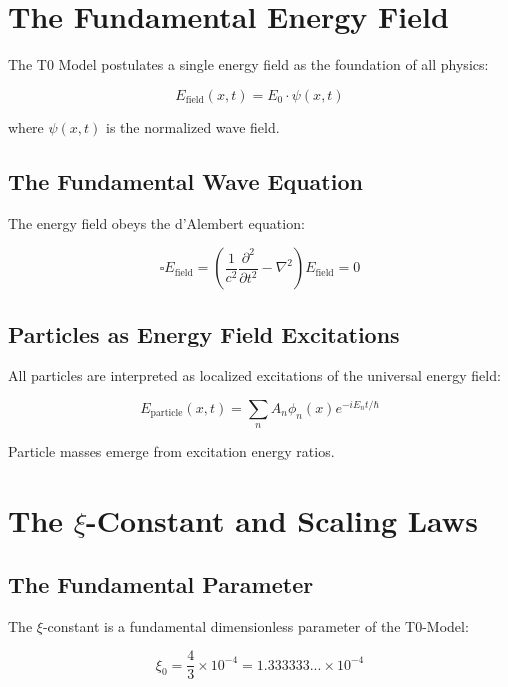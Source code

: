	\section{The Fundamental Energy Field}
	
	The T0 Model postulates a single energy field as the foundation of all physics:
	
	\begin{equation}
		E_{\text{field}}(x,t) = E_0 \cdot \psi(x,t)
	\end{equation}
	
	where $\psi(x,t)$ is the normalized wave field.
	
	\subsection{The Fundamental Wave Equation}
	
	The energy field obeys the d'Alembert equation:
	
	\begin{equation}
		\square E_{\text{field}} = \left(\frac{1}{c^2}\frac{\partial^2}{\partial t^2} - \nabla^2\right) E_{\text{field}} = 0
	\end{equation}
	
	\subsection{Particles as Energy Field Excitations}
	
	All particles are interpreted as localized excitations of the universal energy field:
	
	\begin{equation}
		E_{\text{particle}}(x,t) = \sum_n A_n \phi_n(x) e^{-iE_n t/\hbar}
	\end{equation}
	
	Particle masses emerge from excitation energy ratios.
	
\section{The $\xi$-Constant and Scaling Laws}

\subsection{The Fundamental Parameter}

The $\xi$-constant is a fundamental dimensionless parameter of the T0-Model:

\begin{equation}
	\boxed{\xi_0 = \frac{4}{3} \times 10^{-4} = 1.333333... \times 10^{-4}}
\end{equation}

